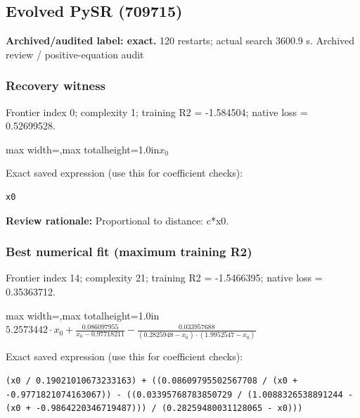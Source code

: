 \documentclass[10pt,letterpaper,landscape]{article}
\begin{document}
\begin{minipage}[t]{0.485\textwidth}
\subsection*{Evolved PySR (709715)}
\textbf{Archived/audited label: exact.} 120 restarts; actual search 3600.9 s.
{\small Archived review / positive-equation audit}
\subsubsection*{Recovery witness}
Frontier index 0; complexity 1; training R2 = -1.584504; native loss = 0.52699528.
\begin{center}\begin{adjustbox}{max width=\linewidth,max totalheight=1.0in}$\displaystyle x_{0}$\end{adjustbox}\end{center}
{\scriptsize Exact saved expression (use this for coefficient checks):}
\begin{lstlisting}
x0
\end{lstlisting}
{\small\textbf{Review rationale:} Proportional to distance: c*x0.}
\subsubsection*{Best numerical fit (maximum training R2)}
Frontier index 14; complexity 21; training R2 = -1.5466395; native loss = 0.35363712.
\begin{center}\begin{adjustbox}{max width=\linewidth,max totalheight=1.0in}$\displaystyle 5.2573442 \cdot x_{0} + \frac{0.086097955}{x_{0} - 0.97718211} - \frac{0.033957688}{\left(0.2825948 - x_{0}\right) \cdot \left(1.9952547 - x_{0}\right)}$\end{adjustbox}\end{center}
{\scriptsize Exact saved expression (use this for coefficient checks):}
\begin{lstlisting}
(x0 / 0.19021010673233163) + ((0.08609795502567708 / (x0 + -0.9771821074163067)) - ((0.03395768783850729 / (1.0088326538891244 - (x0 + -0.9864220346719487))) / (0.28259480031128065 - x0)))
\end{lstlisting}
\end{minipage}
\clearpage{}\label{hubble-10005}
\end{document}
